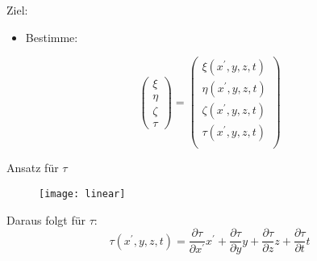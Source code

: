 \documentclass[]{beamer}%
\begin{document}
\begin{frame}{Ziel:}
    \begin{itemize}
        \item Bestimme:
    \end{itemize}
    \begin{equation*}
        \begin{pmatrix}
            \xi \\ 
            \eta \\ 
            \zeta\\ 
            \tau 
        \end{pmatrix}
    =
        \begin{pmatrix}
            \xi     \left( x^\prime, y, z, t\right) \\ 
            \eta    \left( x^\prime, y, z, t\right) \\  
            \zeta   \left( x^\prime, y, z, t\right) \\  
            \tau    \left( x^\prime, y, z, t\right) \\  
        \end{pmatrix}
    \end{equation*}
\end{frame}

\begin{frame}{Ansatz für $\tau$}
    \begin{figure}[h]
        \centering
        \texttt{[image: linear]}
        \caption{\cite{Einstein1905}}
    \end{figure}
    Daraus folgt für $\tau$:
    \begin{equation*}
        \tau    \left( x^\prime, y, z, t\right)
        =
        \frac{\partial \tau}{\partial x^\prime} x^\prime
        +
        \frac{\partial \tau}{\partial y} y
        +
        \frac{\partial \tau}{\partial z} z
        +
        \frac{\partial \tau}{\partial t} t
    \end{equation*}
\end{frame}
\end{document}
